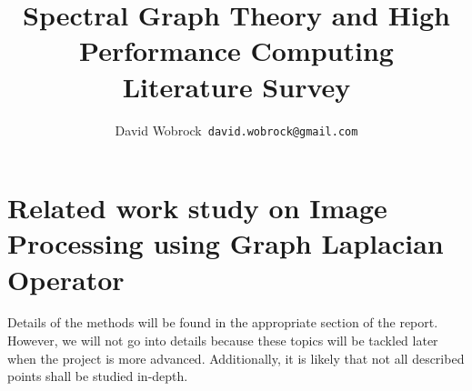 \documentclass[]{article}
\title{Spectral Graph Theory and High Performance Computing \\ Literature Survey}
\author{David Wobrock\ \texttt{david.wobrock@gmail.com}}
\begin{document}
\maketitle

\section{Related work study on Image Processing using Graph Laplacian Operator}



Details of the methods will be found in the appropriate section of the report.
However, we will not go into details because these topics will be tackled later when the project is more advanced.
Additionally, it is likely that not all described points shall be studied in-depth.

\clearpage
\printbibliography
\end{document}

